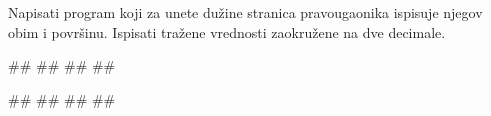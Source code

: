 \begin{comment}
\begin{Exercise}[label=v1.1_07] 
Ovaj zadatak je radjen na praktikumu (jednakostranicni trougao), dole je naveden. Da li da ostane dole ili da se prebaci ovde?
\komentarM{Mislim da redosled treba da bude po smislu, a ne po vezbe/praktikum podeli. Zato, ako mu je mesto ovde, onda ga tu treba i prebaciti.}
\komentarM{Zadatke poredjati na pocetku i po tipovima, a posle mogu i da se mesaju: dakle da prvo ide par zadataka koji rade sa celobrojnim vrednostima, a onda zadaci koji rade sa realnim vrednostima.}
\komentarM{Redosled zadataka je vrlo osetljiva stvar i to bih ostavila za kasniju fazu: za sada samo okvirno kako nam se ucini da treba, a onda posle ce biti jos tumbanja. Zato nije vazno da se brojevi zadataka i resenja poklapaju u ovom trenutku, kada napravimo finalno rasporedjivanje onda cemo da menjamo te brojeve. Za rasporedjivanje zadataka vazna su nam i resenja.}
\linkresenje{v1.1_07}
\end{Exercise}
\begin{Answer}[ref=v1.1_07]
\includecode{resenja/1_KontrolaToka/1.1_UvodniZadaci/1_07.c}
\end{Answer}
\end{comment}

\begin{Exercise}[label=p1.1_02] 
Napisati program koji za unete dužine stranica pravougaonika ispisuje njegov obim i površinu. Ispisati tražene vrednosti zaokružene na dve decimale.

\begin{miditest}
\begin{upotreba}{1}
#\naslovInt#
##
##
##
\end{upotreba}
\end{miditest}
\begin{miditest}
\begin{upotreba}{2}
#\naslovInt#
##
##
##
\end{upotreba}
\end{miditest}

\end{Exercise}
\begin{Answer}[ref=p1.1_02]
\end{Answer}


